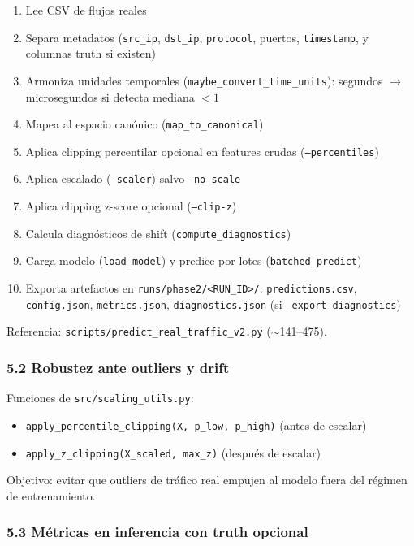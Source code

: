﻿\documentclass[12pt,a4paper]{article}
\begin{document}
\begin{enumerate}
  \item Lee CSV de flujos reales
  \item Separa metadatos (\texttt{src\_ip}, \texttt{dst\_ip}, \texttt{protocol}, puertos,
        \texttt{timestamp}, y columnas truth si existen)
  \item Armoniza unidades temporales (\verb|maybe_convert_time_units|): segundos $\to$
        microsegundos si detecta mediana $<1$
  \item Mapea al espacio canónico (\verb|map_to_canonical|)
  \item Aplica clipping percentilar opcional en features crudas (\texttt{--percentiles})
  \item Aplica escalado (\texttt{--scaler}) salvo \texttt{--no-scale}
  \item Aplica clipping z-score opcional (\texttt{--clip-z})
  \item Calcula diagnósticos de shift (\verb|compute_diagnostics|)
  \item Carga modelo (\verb|load_model|) y predice por lotes (\verb|batched_predict|)
  \item Exporta artefactos en \verb|runs/phase2/<RUN_ID>/|:
        \texttt{predictions.csv}, \texttt{config.json}, \texttt{metrics.json},
        \texttt{diagnostics.json} (si \texttt{--export-diagnostics})
\end{enumerate}

Referencia: \verb|scripts/predict_real_traffic_v2.py| ($\sim$141--475).

\subsubsection{5.2 Robustez ante outliers y drift}

Funciones de \verb|src/scaling_utils.py|:

\begin{itemize}
  \item \verb|apply_percentile_clipping(X, p_low, p_high)| (antes de escalar)
  \item \verb|apply_z_clipping(X_scaled, max_z)| (después de escalar)
\end{itemize}

Objetivo: evitar que outliers de tráfico real empujen al modelo fuera del régimen de entrenamiento.

\subsubsection{5.3 Métricas en inferencia con truth opcional}
\end{document}

